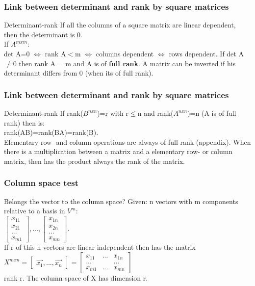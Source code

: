 \begin{frame}
	\frametitle{Link between determinant and rank by square matrices}
	\begin{block}{Determinant-rank}
		If all the columns of a square matrix are linear dependent, then the determinant is 0. \\
		If $A^{mxm}$: \\
		det A=0 $\Leftrightarrow$ rank A$<$m $\Leftrightarrow$ columns dependent $\Leftrightarrow$ rows dependent.
		If det A $\neq 0$ then rank A = m and A is of {\bf full rank}. A matrix can be inverted if his determinant differs from 0 (when its of full rank).
	\end{block}
\end{frame}

\begin{frame}
	\frametitle{Link between determinant and rank by square matrices}
	\begin{block}{Determinant-rank}
		If rank($B^{nxn}$)=r with r$\leq$n and rank($A^{nxn}$)=n (A is of full rank) then is:\\
		rank(AB)=rank(BA)=rank(B).\\
		Elementary row- and column operations are always of full rank (appendix). When there is a multiplication between a matrix and a elementary row- or column matrix, then has the product always the rank of the matrix.
	\end{block}
\end{frame}

\begin{frame}
	\frametitle{Column space test}
	\begin{block}{Belongs the vector to the column space?}
		Given: n vectors with m components relative to a basis in $V^m$:\\
		$\begin{bmatrix} x_{11}\\x_{21}\\...\\x_{m1} \end{bmatrix},...,\begin{bmatrix} x_{1n}\\x_{2n}\\...\\x_{mn}\end{bmatrix}$.\\
		If r of this n vectors are linear independent then has the matrix \\
		$X^{mxn}=\begin{bmatrix} \overrightarrow{x_1},...,\overrightarrow{x_n}\end{bmatrix}=\begin{bmatrix} x_{11} & ... & x_{1n}\\ ... & & ...\\ x_{m1} & ... & x_{mn}\end{bmatrix}$\\
		rank r. The column space of X has dimension r.
	\end{block}
\end{frame}

